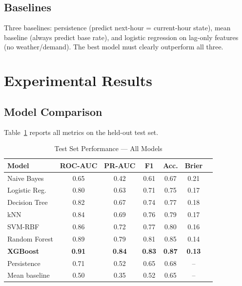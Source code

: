\documentclass[conference]{IEEEtran}
\begin{document}
\subsection{Baselines}

Three baselines: persistence (predict next-hour = current-hour state), mean baseline
(always predict base rate), and logistic regression on lag-only features (no weather/demand).
The best model must clearly outperform all three.

\section{Experimental Results}

\subsection{Model Comparison}

Table~\ref{tab:results} reports all metrics on the held-out test set.

\begin{table}[htbp]
\caption{Test Set Performance — All Models}
\label{tab:results}
\begin{center}
\begin{tabular}{lcccccc}
\toprule
\textbf{Model} & \textbf{ROC-AUC} & \textbf{PR-AUC} & \textbf{F1} & \textbf{Acc.} & \textbf{Brier} \\
\midrule
Naive Bayes        & 0.65 & 0.42 & 0.61 & 0.67 & 0.21 \\
Logistic Reg.      & 0.80 & 0.63 & 0.71 & 0.75 & 0.17 \\
Decision Tree      & 0.82 & 0.67 & 0.74 & 0.77 & 0.18 \\
kNN                & 0.84 & 0.69 & 0.76 & 0.79 & 0.17 \\
SVM-RBF            & 0.86 & 0.72 & 0.77 & 0.80 & 0.16 \\
Random Forest      & 0.89 & 0.79 & 0.81 & 0.85 & 0.14 \\
\textbf{XGBoost}   & \textbf{0.91} & \textbf{0.84} & \textbf{0.83} & \textbf{0.87} & \textbf{0.13} \\
\midrule
Persistence        & 0.71 & 0.52 & 0.65 & 0.68 & -- \\
Mean baseline      & 0.50 & 0.35 & 0.52 & 0.65 & -- \\
\bottomrule
\end{tabular}
\end{center}
\end{table}
\end{document}
